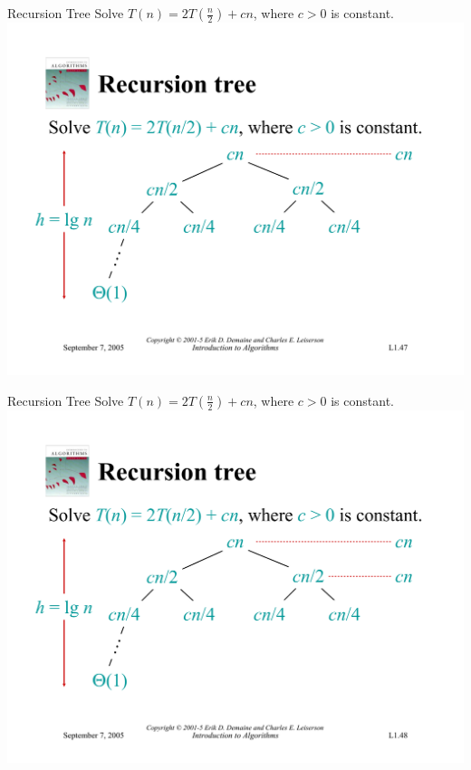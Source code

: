 \documentclass{beamer}
\begin{document}
\begin{frame}{Recursion Tree}
    Solve $T(n) = 2T(\frac{n}{2}) + cn$, where $c > 0$ is constant.\\
    \vspace{5mm}
    \centering
    \includegraphics[width=\textwidth, trim={0.49cm 1.25cm 0.7cm 5.75cm}, clip]{pages/lec1_47}
\end{frame}
\begin{frame}{Recursion Tree}
    Solve $T(n) = 2T(\frac{n}{2}) + cn$, where $c > 0$ is constant.\\
    \vspace{5mm}
    \centering
    \includegraphics[width=\textwidth, trim={0.49cm 1.25cm 0.7cm 5.75cm}, clip]{pages/lec1_48}
\end{frame}
\end{document}
